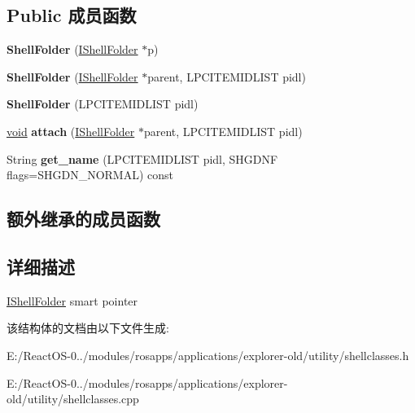 \subsection*{Public 成员函数}
\begin{DoxyCompactItemize}
\item 
\mbox{\label{struct_shell_folder_a65d2bfb9c0fd11e2ce05ba03e284573a}} 
{\bfseries Shell\+Folder} (\hyperlink{interface_i_shell_folder}{I\+Shell\+Folder} $\ast$p)
\item 
\mbox{\label{struct_shell_folder_a7f6e817c6c4c08c8b7ca11d38785c64a}} 
{\bfseries Shell\+Folder} (\hyperlink{interface_i_shell_folder}{I\+Shell\+Folder} $\ast$parent, L\+P\+C\+I\+T\+E\+M\+I\+D\+L\+I\+ST pidl)
\item 
\mbox{\label{struct_shell_folder_a2a16cf7f95e908896bb1b3f1216d88b9}} 
{\bfseries Shell\+Folder} (L\+P\+C\+I\+T\+E\+M\+I\+D\+L\+I\+ST pidl)
\item 
\mbox{\label{struct_shell_folder_a9eeecb8c63b311656887083bf61ae642}} 
\hyperlink{interfacevoid}{void} {\bfseries attach} (\hyperlink{interface_i_shell_folder}{I\+Shell\+Folder} $\ast$parent, L\+P\+C\+I\+T\+E\+M\+I\+D\+L\+I\+ST pidl)
\item 
\mbox{\label{struct_shell_folder_a1e1fda30794c2c11764f97127422415c}} 
String {\bfseries get\+\_\+name} (L\+P\+C\+I\+T\+E\+M\+I\+D\+L\+I\+ST pidl, S\+H\+G\+D\+NF flags=S\+H\+G\+D\+N\+\_\+\+N\+O\+R\+M\+AL) const
\end{DoxyCompactItemize}
\subsection*{额外继承的成员函数}


\subsection{详细描述}
\hyperlink{interface_i_shell_folder}{I\+Shell\+Folder} smart pointer 

该结构体的文档由以下文件生成\+:\begin{DoxyCompactItemize}
\item 
E\+:/\+React\+O\+S-\/0../modules/rosapps/applications/explorer-\/old/utility/shellclasses.\+h\item 
E\+:/\+React\+O\+S-\/0../modules/rosapps/applications/explorer-\/old/utility/shellclasses.\+cpp\end{DoxyCompactItemize}
